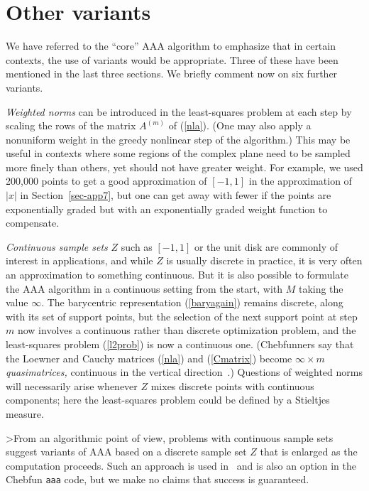 \documentclass[final]{siamltex}
\def\Am{A^{(m)}}
\begin{document}
\section{\label{sec-variants}\boldmath Other variants}
We have referred to the ``core'' AAA algorithm to emphasize that
in certain contexts, the use of variants would be appropriate.
Three of these have been mentioned in the last three sections.
We briefly comment now on six further variants.

{\em Weighted norms} can be introduced in the least-squares
problem at each step by scaling the rows of the matrix $\Am$ of
(\ref{nla}).  (One may also apply a nonuniform weight in the
greedy nonlinear step of the algorithm.)  This may be useful in
contexts where some regions of the complex plane need to be sampled
more finely than others, yet should not have greater weight.
For example, we used 200,000 points to get a good approximation of
$[-1,1]$ in the approximation of $|x|$ in Section~\ref{sec-app7},
but one can get away with fewer if the points are exponentially
graded but with an exponentially graded weight function to
compensate.

{\em Continuous sample sets} $Z$ such as $[-1,1]$ or the unit disk
are commonly of interest in applications, and while $Z$ is
usually discrete in practice, it is very often an approximation
to something continuous.  But it is also possible to formulate
the AAA algorithm in a continuous setting from the start, with
$M$ taking the value $\infty$.  The barycentric representation
(\ref{baryagain}) remains discrete, along with its set of support
points, but the selection of the next support point at step $m$
now involves a continuous rather than discrete optimization
problem, and the least-squares problem (\ref{l2prob}) is now a
continuous one.  (Chebfunners say that the Loewner and Cauchy
matrices (\ref{nla}) and (\ref{Cmatrix}) become $\infty\times
m$ {\em quasimatrices,} continuous in the vertical direction~\cite{chebfun}.)
Questions of weighted norms will necessarily arise whenever
$Z$ mixes discrete points with continuous components; here the
least-squares problem could be defined by a Stieltjes measure.

>From an algorithmic point of view, problems with continuous sample
sets suggest variants of AAA based on a discrete sample set $Z$
that is enlarged as the computation proceeds.  Such an approach is
used in~\cite{in} and is also an option in the Chebfun {\tt aaa}
code, but we make no claims that success is guaranteed.
\end{document}
